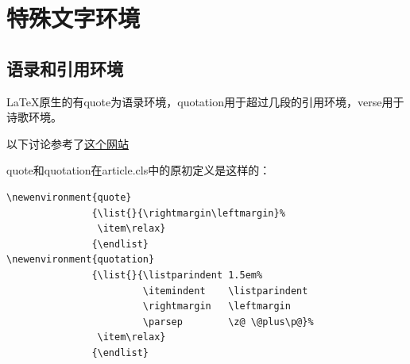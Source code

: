 \documentclass[11pt,oneside]{book}
\begin{document}
\chapter{特殊文字环境}
\section{语录和引用环境}
\LaTeX 原生的有quote为语录环境，quotation用于超过几段的引用环境，verse用于诗歌环境。

以下讨论参考了\href{http://tex.stackexchange.com/questions/33219/whats-the-difference-between-the-environments-quote-and-quotation}{这个网站}

quote和quotation在article.cls中的原初定义是这样的：
\begin{Verbatim}
\newenvironment{quote}
               {\list{}{\rightmargin\leftmargin}%
                \item\relax}
               {\endlist}
\newenvironment{quotation}
               {\list{}{\listparindent 1.5em%
                        \itemindent    \listparindent
                        \rightmargin   \leftmargin
                        \parsep        \z@ \@plus\p@}%
                \item\relax}
               {\endlist}
\end{Verbatim}
\end{document}
